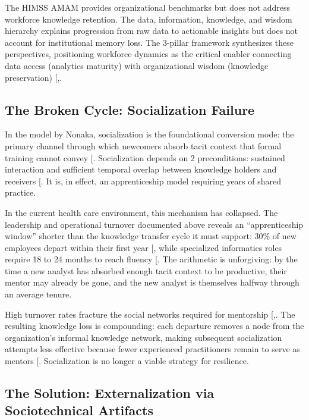 \documentclass[
  american,
  11pt,
  letterpaper,
  oneside  ,captions=tableheading
]{scrartcl}
\begin{document}
The HIMSS AMAM provides organizational benchmarks but does not address
workforce knowledge retention. The data, information, knowledge, and
wisdom hierarchy explains progression from raw data to actionable
insights but does not account for institutional memory loss. The
3-pillar framework synthesizes these perspectives, positioning workforce
dynamics as the critical enabler connecting data access (analytics
maturity) with organizational wisdom (knowledge preservation)
{[},\citeproc{ref-farnese2019}{20}{]}.

\subsection{The Broken Cycle: Socialization
Failure}\label{the-broken-cycle-socialization-failure}

In the model by Nonaka, socialization is the foundational conversion
mode: the primary channel through which newcomers absorb tacit context
that formal training cannot convey {[}\citeproc{ref-farnese2019}{20}{]}.
Socialization depends on 2 preconditions: sustained interaction and
sufficient temporal overlap between knowledge holders and receivers
{[}\citeproc{ref-foos2006}{22}{]}. It is, in effect, an apprenticeship
model requiring years of shared practice.

In the current health care environment, this mechanism has collapsed.
The leadership and operational turnover documented above reveals an
``apprenticeship window'' shorter than the knowledge transfer cycle it
must support: 30\% of new employees depart within their first year
{[}\citeproc{ref-nsi2025}{23}{]}, while specialized informatics roles
require 18 to 24 months to reach fluency
{[}\citeproc{ref-ledikwe2013}{17}{]}. The arithmetic is unforgiving: by
the time a new analyst has absorbed enough tacit context to be
productive, their mentor may already be gone, and the new analyst is
themselves halfway through an average tenure.

High turnover rates fracture the social networks required for mentorship
{[},\citeproc{ref-wu2024}{8}{]}. The resulting
knowledge loss is compounding: each departure removes a node from the
organization's informal knowledge network, making subsequent
socialization attempts less effective because fewer experienced
practitioners remain to serve as mentors
{[}\citeproc{ref-massingham2018}{24}{]}. Socialization is no longer a
viable strategy for resilience.

\subsection{The Solution: Externalization via Sociotechnical
Artifacts}\label{the-solution-externalization-via-sociotechnical-artifacts}
\end{document}
